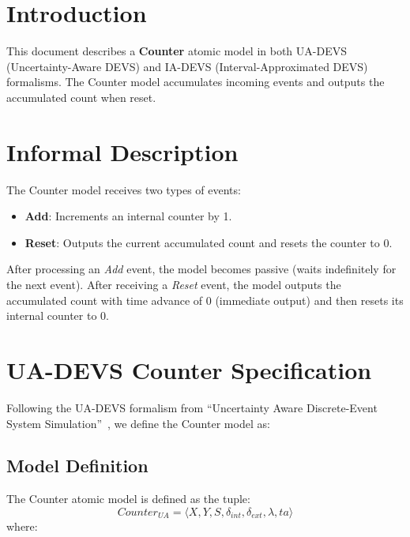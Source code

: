 \section{Introduction}

This document describes a \textbf{Counter} atomic model in both UA-DEVS (Uncertainty-Aware DEVS) and IA-DEVS (Interval-Approximated DEVS) formalisms. The Counter model accumulates incoming events and outputs the accumulated count when reset.

\section{Informal Description}

The Counter model receives two types of events:
\begin{itemize}
    \item \textbf{Add}: Increments an internal counter by 1.
    \item \textbf{Reset}: Outputs the current accumulated count and resets the counter to 0.
\end{itemize}

After processing an \textit{Add} event, the model becomes passive (waits indefinitely for the next event). After receiving a \textit{Reset} event, the model outputs the accumulated count with time advance of 0 (immediate output) and then resets its internal counter to 0.

\section{UA-DEVS Counter Specification}

Following the UA-DEVS formalism from ``Uncertainty Aware Discrete-Event System Simulation''~\cite{vicino2021uncertainty}, we define the Counter model as:

\subsection{Model Definition}

The Counter atomic model is defined as the tuple:
\[
Counter_{UA} = \langle X, Y, S, \delta_{int}, \delta_{ext}, \lambda, ta \rangle
\]
where:

